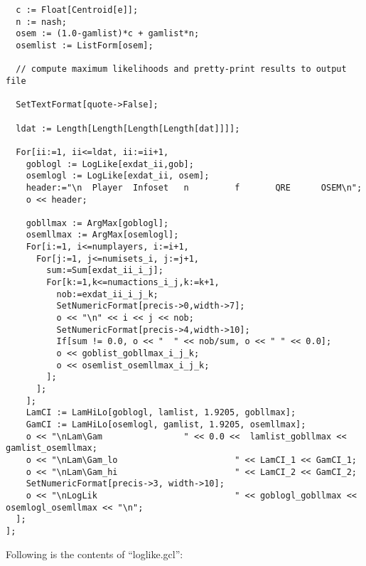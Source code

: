 {\begin{verbatim}
  c := Float[Centroid[e]];
  n := nash;
  osem := (1.0-gamlist)*c + gamlist*n;
  osemlist := ListForm[osem];

  // compute maximum likelihoods and pretty-print results to output file

  SetTextFormat[quote->False];

  ldat := Length[Length[Length[Length[dat]]]];

  For[ii:=1, ii<=ldat, ii:=ii+1,
    goblogl := LogLike[exdat_ii,gob];
    osemlogl := LogLike[exdat_ii, osem];
    header:="\n  Player  Infoset   n         f       QRE      OSEM\n";
    o << header;

    gobllmax := ArgMax[goblogl];
    osemllmax := ArgMax[osemlogl];
    For[i:=1, i<=numplayers, i:=i+1,
      For[j:=1, j<=numisets_i, j:=j+1,
        sum:=Sum[exdat_ii_i_j];
        For[k:=1,k<=numactions_i_j,k:=k+1,
          nob:=exdat_ii_i_j_k;
          SetNumericFormat[precis->0,width->7];
          o << "\n" << i << j << nob;
          SetNumericFormat[precis->4,width->10];
          If[sum != 0.0, o << "  " << nob/sum, o << " " << 0.0];
          o << goblist_gobllmax_i_j_k;
          o << osemlist_osemllmax_i_j_k;
        ];
      ];
    ];
    LamCI := LamHiLo[goblogl, lamlist, 1.9205, gobllmax];
    GamCI := LamHiLo[osemlogl, gamlist, 1.9205, osemllmax];
    o << "\nLam\Gam                " << 0.0 <<  lamlist_gobllmax << gamlist_osemllmax;
    o << "\nLam\Gam_lo                       " << LamCI_1 << GamCI_1;
    o << "\nLam\Gam_hi                       " << LamCI_2 << GamCI_2;
    SetNumericFormat[precis->3, width->10];
    o << "\nLogLik                           " << goblogl_gobllmax << osemlogl_osemllmax << "\n";
  ];
];
\end{verbatim}
}

\noindent
Following is the contents of ``loglike.gcl'':

